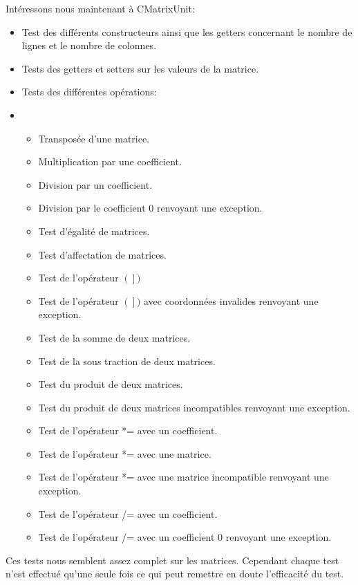 		Intéressons nous maintenant à CMatrixUnit:
		\begin{itemize}
			\item Test des différents constructeurs ainsi que les getters concernant le nombre de lignes et le nombre de colonnes.
			\item Tests des getters et setters sur les valeurs de la matrice.
			\item Tests des différentes opérations:
			\item 
			\begin{itemize}
				\item Transposée d'une matrice.
				\item Multiplication par une coefficient.
				\item Division par un coefficient.
				\item Division par le coefficient 0 renvoyant une exception.
				\item Test d'égalité de matrices.
				\item Test d'affectation de matrices.
				\item Test de l'opérateur $\left(\right])$
				\item Test de l'opérateur $\left(\right])$ avec coordonnées invalides renvoyant une exception.
				\item Test de la somme de deux matrices.
				\item Test de la sous traction de deux matrices.
				\item Test du produit de deux matrices.
				\item Test du produit de deux matrices incompatibles renvoyant une exception.
				\item Test de l'opérateur *= avec un coefficient.
				\item Test de l'opérateur *= avec une matrice.
				\item Test de l'opérateur *= avec une matrice incompatible renvoyant une exception.
				\item Test de l'opérateur /= avec un coefficient.
				\item Test de l'opérateur /= avec un coefficient 0 renvoyant une exception.
			\end{itemize}
		\end{itemize}
		
		Ces tests nous semblent assez complet sur les matrices. Cependant chaque test n'est effectué qu'une seule fois ce qui peut remettre en doute l'efficacité du test.
		
